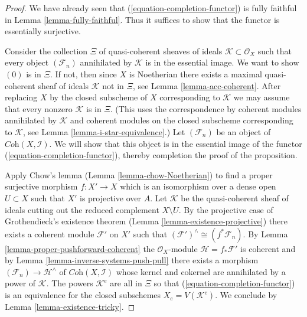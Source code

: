 \begin{proof}
We have already seen that (\ref{equation-completion-functor}) is
fully faithful in Lemma \ref{lemma-fully-faithful}. Thus it suffices
to show that the functor is essentially surjective.

\medskip\noindent
Consider the collection $\Xi$ of quasi-coherent sheaves of ideals
$\mathcal{K} \subset \mathcal{O}_X$ such that every object
$(\mathcal{F}_n)$ annihilated by $\mathcal{K}$ is in the essential image.
We want to show $(0)$ is in $\Xi$. If not, then since $X$ is Noetherian
there exists a maximal quasi-coherent sheaf of ideals $\mathcal{K}$
not in $\Xi$, see
Lemma \ref{lemma-acc-coherent}.
After replacing $X$ by the closed subscheme of $X$
corresponding to $\mathcal{K}$ we may assume that every nonzero
$\mathcal{K}$ is in $\Xi$. (This uses the correspondence by
coherent modules annihilated by $\mathcal{K}$ and coherent modules
on the closed subscheme corresponding to $\mathcal{K}$, see
Lemma \ref{lemma-i-star-equivalence}.)
Let $(\mathcal{F}_n)$ be an object of
$\textit{Coh}(X, \mathcal{I})$.
We will show that this object is in the essential image of the
functor (\ref{equation-completion-functor}), thereby completion the
proof of the proposition.

\medskip\noindent
Apply Chow's lemma (Lemma \ref{lemma-chow-Noetherian}) to find a
proper surjective morphism $f : X' \to X$ which is an isomorphism
over a dense open $U \subset X$ such that $X'$ is projective over $A$.
Let $\mathcal{K}$ be the quasi-coherent sheaf of ideals cutting
out the reduced complement $X \setminus U$. By the projective
case of Grothendieck's existence theorem
(Lemma \ref{lemma-existence-projective})
there exists a coherent module $\mathcal{F}'$ on $X'$ such
that $(\mathcal{F}')^\wedge \cong (f^*\mathcal{F}_n)$. By
Lemma \ref{lemma-proper-pushforward-coherent}
the $\mathcal{O}_X$-module $\mathcal{H} = f_*\mathcal{F}'$ is coherent
and by Lemma \ref{lemma-inverse-systems-push-pull}
there exists a morphism $(\mathcal{F}_n) \to \mathcal{H}^\wedge$
of $\textit{Coh}(X, \mathcal{I})$ whose kernel and cokernel are
annihilated by a power of $\mathcal{K}$. The powers $\mathcal{K}^e$
are all in $\Xi$ so that (\ref{equation-completion-functor})
is an equivalence for the closed subschemes $X_e = V(\mathcal{K}^e)$.
We conclude by Lemma \ref{lemma-existence-tricky}.
\end{proof}

